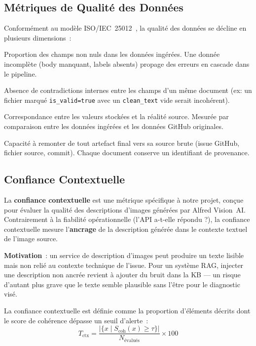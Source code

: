 \subsection{Métriques de Qualité des Données}
\label{sec:def_data_quality}

Conformément au modèle ISO/IEC~25012~\cite{iso25012}, la qualité des données se décline en plusieurs dimensions~:

\begin{description}[leftmargin=3cm, labelwidth=2.8cm]
  \item[Complétude] Proportion des champs non nuls dans les données ingérées. Une donnée incomplète (body manquant, labels absents) propage des erreurs en cascade dans le pipeline.
  \item[Cohérence] Absence de contradictions internes entre les champs d'un même document (ex: un fichier marqué \texttt{is\_valid=true} avec un \texttt{clean\_text} vide serait incohérent).
  \item[Exactitude] Correspondance entre les valeurs stockées et la réalité source. Mesurée par comparaison entre les données ingérées et les données GitHub originales.
  \item[Traçabilité] Capacité à remonter de tout artefact final vers sa source brute (issue GitHub, fichier source, commit). Chaque document conserve un identifiant de provenance.
\end{description}

\subsection{Confiance Contextuelle}
\label{sec:def_confiance_contextuelle}

La \textbf{confiance contextuelle} est une métrique spécifique à notre projet, conçue pour évaluer la qualité des descriptions d'images générées par Alfred Vision~AI. Contrairement à la fiabilité opérationnelle (l'API a-t-elle répondu ?), la confiance contextuelle mesure l'\textbf{ancrage} de la description générée dans le contexte textuel de l'image source.

\textbf{Motivation}~: un service de description d'images peut produire un texte lisible mais non relié au contexte technique de l'issue. Pour un système RAG, injecter une description non ancrée revient à ajouter du bruit dans la KB --- un risque d'autant plus grave que le texte semble plausible sans l'être pour le diagnostic visé.

La confiance contextuelle est définie comme la proportion d'éléments décrits dont le score de cohérence dépasse un seuil d'alerte~:
\begin{equation}
T_{\text{ctx}} = \frac{|\{x \mid S_{\text{coh}}(x) \geq \tau\}|}{N_{\text{évalués}}} \times 100
\label{eq:confiance_contextuelle_def}
\end{equation}

